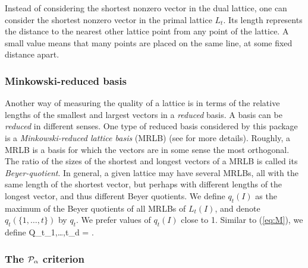 Instead of considering the shortest nonzero vector in the dual lattice,
one can consider the shortest nonzero vector in the primal lattice $L_t$.
Its length represents the distance to the nearest other lattice point 
from any point of the lattice.  A small value means that many points
are placed on the same line, at some fixed distance apart.

\subsubsection {Minkowski-reduced basis}

Another way of measuring the quality of a lattice is in terms of the
relative lengths of the smallest and largest vectors in a 
{\em reduced\/} basis.
A basis can be {\em reduced\/} in different senses.
One type of reduced basis considered by this package is a 
{\it Minkowski-reduced lattice basis\/} (MRLB)
(see \cite{rAFF85a,rAFF88a,rGRO88a} for more details).
Roughly, a MRLB is a basis for which the vectors are in some sense the 
most orthogonal.
The ratio of the sizes of the shortest and longest vectors of a MRLB
is called its {\it Beyer-quotient\/}.
In general, a given lattice may have several MRLBs, all with
the same length of the shortest vector, but perhaps with
different lengths of the longest vector, and thus different Beyer quotients.
We define $q_t(I)$ as the maximum of the Beyer quotients of all MRLBs
of $L_t(I)$, and denote $q_t(\{1,\dots,t\})$ by $q_t$.   
We prefer values of $q_t(I)$ close to 1.
Similar to (\ref{eq:M}), we define
\eq
 Q_{t_1,\dots,t_d} = \min{}.
                                                            \label{eq:Q}
\endeq

\subsubsection {The ${\cal P}_\alpha$ criterion}

